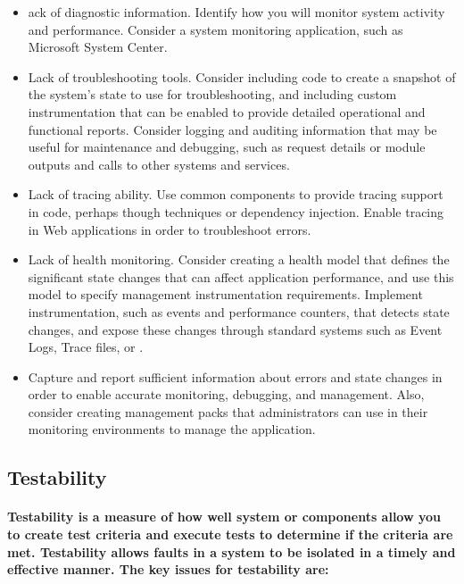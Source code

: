 \documentclass[../Psychological_system_web_application.tex]{subfiles}
\begin{document}
				\begin{itemize}
					\item
						ack of diagnostic information. Identify how you will monitor system activity and performance. Consider a system monitoring application, such as Microsoft System Center.
					\item
						Lack of troubleshooting tools. Consider including code to create a snapshot of the system’s state to use for troubleshooting, and including custom instrumentation that can be enabled to provide detailed operational and functional reports. Consider logging and auditing information that may be useful for maintenance and debugging, such as request details or module outputs and calls to other systems and services.
					\item
						Lack of tracing ability. Use common components to provide tracing support in code, perhaps though  techniques or dependency injection. Enable tracing in Web applications in order to troubleshoot errors.
					\item
						Lack of health monitoring. Consider creating a health model that defines the significant state changes that can affect application performance, and use this model to specify management instrumentation requirements. Implement instrumentation, such as events and performance counters, that detects state changes, and expose these changes through standard systems such as Event Logs, Trace files, or .
					\item
						Capture and report sufficient information about errors and state changes in order to enable accurate monitoring, debugging, and management. Also, consider creating management packs that administrators can use in their monitoring environments to manage the application.
					
				\end{itemize}			
			
				\subsection{Testability}
				
					\paragraph{\gls{Testability} is a measure of how well system or components allow you to create test criteria and execute tests to determine if the criteria are met. Testability allows faults in a system to be isolated in a timely and effective manner. The key issues for testability are:}
					
\end{document}
